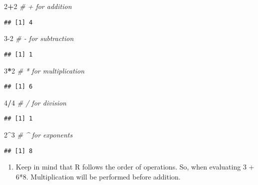 \documentclass[]{article}
\newenvironment{Shaded}{\begin{snugshade}}{\end{snugshade}}
\newcommand{\CommentTok}[1]{\textcolor[rgb]{0.56,0.35,0.01}{\textit{#1}}}
\newcommand{\DecValTok}[1]{\textcolor[rgb]{0.00,0.00,0.81}{#1}}
\newcommand{\OperatorTok}[1]{\textcolor[rgb]{0.81,0.36,0.00}{\textbf{#1}}}
\providecommand{\tightlist}{%
  \setlength{\itemsep}{0pt}\setlength{\parskip}{0pt}}
\begin{document}
\begin{Shaded}
\begin{Highlighting}[]
\DecValTok{2}\OperatorTok{+}\DecValTok{2}  \CommentTok{# + for addition}
\end{Highlighting}
\end{Shaded}

\begin{verbatim}
## [1] 4
\end{verbatim}

\begin{Shaded}
\begin{Highlighting}[]
\DecValTok{3-2}  \CommentTok{# - for subtraction}
\end{Highlighting}
\end{Shaded}

\begin{verbatim}
## [1] 1
\end{verbatim}

\begin{Shaded}
\begin{Highlighting}[]
\DecValTok{3}\OperatorTok{*}\DecValTok{2}  \CommentTok{# * for multiplication}
\end{Highlighting}
\end{Shaded}

\begin{verbatim}
## [1] 6
\end{verbatim}

\begin{Shaded}
\begin{Highlighting}[]
\DecValTok{4}\OperatorTok{/}\DecValTok{4}  \CommentTok{# / for division}
\end{Highlighting}
\end{Shaded}

\begin{verbatim}
## [1] 1
\end{verbatim}

\begin{Shaded}
\begin{Highlighting}[]
\DecValTok{2}\OperatorTok{^}\DecValTok{3}  \CommentTok{# ^ for exponents}
\end{Highlighting}
\end{Shaded}

\begin{verbatim}
## [1] 8
\end{verbatim}

\begin{enumerate}
\def\labelenumi{\arabic{enumi}.}
\setcounter{enumi}{3}
\tightlist
\item
  Keep in mind that R follows the order of operations. So, when
  evaluating 3 + 6*8. Multiplication will be performed before addition.
\end{enumerate}
\end{document}
